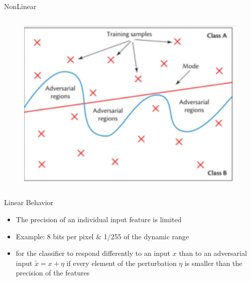 \begin{frame}[fragile]{NonLinear}
	
	\begin{columns}[onlytextwidth]
		\begin{figure}

			\includegraphics[height=.8\textheight]{exp1.jpg}
		\end{figure}

		
	\end{columns}
	
	
	
\end{frame}

\begin{frame}[fragile]{Linear Behavior}

\begin{itemize}
	\item The precision of an individual input feature is limited
	\item Example: 8 bits per pixel \& 1/255 of the dynamic
	range
	\item for the classifier to respond differently to an input $x$ than to an adversarial input $\widetilde{x}= x + \eta $ if every element of the perturbation $\eta$ is smaller than the precision of the features
	
\end{itemize}



\end{frame}

